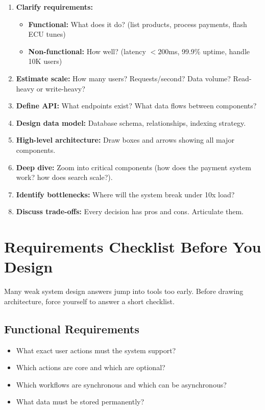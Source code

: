 \documentclass[12pt, a4paper, oneside]{book}
\begin{document}
\begin{enumerate}[leftmargin=2em]
    \item \textbf{Clarify requirements:}
    \begin{itemize}
        \item \textbf{Functional:} What does it do? (list products, process payments, flash ECU tunes)
        \item \textbf{Non-functional:} How well? (latency $< 200$ms, 99.9\% uptime, handle 10K users)
    \end{itemize}
    \item \textbf{Estimate scale:} How many users? Requests/second? Data volume? Read-heavy or write-heavy?
    \item \textbf{Define API:} What endpoints exist? What data flows between components?
    \item \textbf{Design data model:} Database schema, relationships, indexing strategy.
    \item \textbf{High-level architecture:} Draw boxes and arrows showing all major components.
    \item \textbf{Deep dive:} Zoom into critical components (how does the payment system work? how does search scale?).
    \item \textbf{Identify bottlenecks:} Where will the system break under 10x load?
    \item \textbf{Discuss trade-offs:} Every decision has pros and cons. Articulate them.
\end{enumerate}

\section{Requirements Checklist Before You Design}

Many weak system design answers jump into tools too early. Before drawing architecture, force yourself to answer a short checklist.

\subsection{Functional Requirements}
\begin{itemize}[leftmargin=2em]
    \item What exact user actions must the system support?
    \item Which actions are core and which are optional?
    \item Which workflows are synchronous and which can be asynchronous?
    \item What data must be stored permanently?
\end{itemize}
\end{document}
